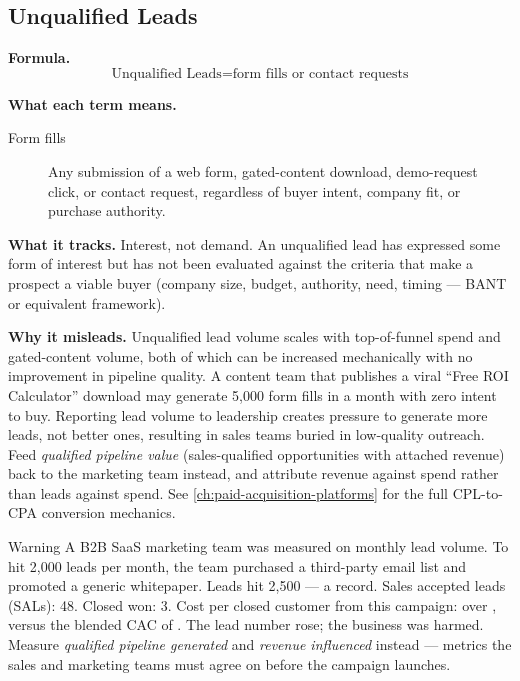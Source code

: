 \subsection{Unqualified Leads}

\textbf{Formula.}
\[
  \text{Unqualified Leads} = \text{form fills or contact requests}
\]

\textbf{What each term means.}
\begin{description}
  \item[Form fills] Any submission of a web form, gated-content download, demo-request
    click, or contact request, regardless of buyer intent, company fit, or purchase
    authority.
\end{description}

\textbf{What it tracks.} Interest, not demand. An unqualified lead has expressed some form
of interest but has not been evaluated against the criteria that make a prospect a viable
buyer (company size, budget, authority, need, timing --- BANT or equivalent framework).

\textbf{Why it misleads.} Unqualified lead volume scales with top-of-funnel spend and
gated-content volume, both of which can be increased mechanically with no improvement in
pipeline quality. A content team that publishes a viral ``Free ROI Calculator'' download
may generate 5,000 form fills in a month with zero intent to buy. Reporting lead volume to
leadership creates pressure to generate more leads, not better ones, resulting in sales teams
buried in low-quality outreach. Feed \emph{qualified pipeline value} (sales-qualified
opportunities with attached revenue) back to the marketing team instead, and attribute
revenue against spend rather than leads against spend. See
\cref{ch:paid-acquisition-platforms} for the full CPL-to-CPA conversion mechanics.

\begin{admonition}{Warning}
A B2B SaaS marketing team was measured on monthly lead volume. To hit 2,000 leads per month,
the team purchased a third-party email list and promoted a generic whitepaper. Leads hit
2,500 --- a record. Sales accepted leads (SALs): 48. Closed won: 3. Cost per closed customer
from this campaign: over , versus the blended CAC of . The lead
number rose; the business was harmed. Measure \emph{qualified pipeline generated} and
\emph{revenue influenced} instead --- metrics the sales and marketing teams must agree on
before the campaign launches.
\end{admonition}


